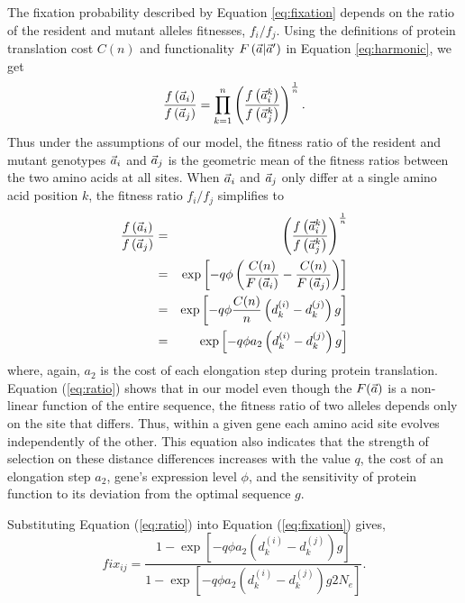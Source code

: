 The fixation probability described by Equation \ref{eq:fixation} depends on the ratio of the resident and mutant alleles fitnesses,  $f_i/f_j$.
Using the definitions of protein translation cost $C(n)$ and functionality $F\left(\vec{a}|\vec{a}^\prime\right)$ in Equation \ref{eq:harmonic}, we get
\begin{equation}
\frac{f\left(\vec{a}_i\right)}{f\left(\vec{a}_j\right)} = \prod_{k=1}^n\left( \frac{f\left(\vec{a}_i^k\right)}{f\left(\vec{a}_j^k\right)}\right)^{\frac{1}{n}}.
\end{equation}
Thus under the assumptions of our model, the fitness ratio of the resident and mutant genotypes $\vec{a}_i$ and $\vec{a}_j$ is the geometric mean of the fitness ratios between the two amino acids at all sites.
When $\vec{a}_i$ and $\vec{a}_j$ only differ at a single amino acid position $k$, the fitness ratio $f_i/f_j$ simplifies to  
\begin{eqnarray}
\frac{f\left(\vec{a}_i\right)}{f\left(\vec{a}_j\right)} & = & \left( \frac{f\left(\vec{a}_i^k\right)}{f\left(\vec{a}_j^k\right)}\right)^{\frac{1}{n}}\\
 & = &\exp \left[-q \phi \left( \frac{ C(n) }{F\left(\vec{a}_i \right)} - \frac{ C(n)}{F\left(\vec{a}_j \right)}\right)\right] \nonumber\\
& = & \exp\left[ - q \phi \frac{C(n)}{n}\left(d_k^{(i)} - d_k^{(j)}\right) g\right]\\
& = & \exp\left[ - q \phi a_2 \left(d_k^{(i)} - d_k^{(j)}\right) g\right] \label{eq:ratio}
\end{eqnarray}
where, again, $a_2$ is the cost of each elongation step during protein translation. 
Equation (\ref{eq:ratio}) shows that in our model even though the $F(\vec{a})$ is a non-linear function of the entire sequence,  the fitness ratio of two alleles depends only on the site that differs.
Thus,  within a given gene each amino acid site  evolves independently of the other.
This equation also indicates that the strength of selection on these distance differences increases with the value $q$, the cost of an elongation step $a_2$, gene's expression level $\phi$, and the sensitivity of protein function to its deviation from the optimal sequence $g$.


Substituting Equation (\ref{eq:ratio}) into Equation (\ref{eq:fixation}) gives,
\begin{equation}
fix_{ij} = \frac{1-\exp\left[ - q \phi a_2 \left(d_k^{(i)} - d_k^{(j)}\right) g\right]}{1-\exp\left[ - q \phi a_2 \left(d_k^{(i)} - d_k^{(j)}\right) g 2N_e\right]}.
\label{eq:fixationII}
\end{equation}

